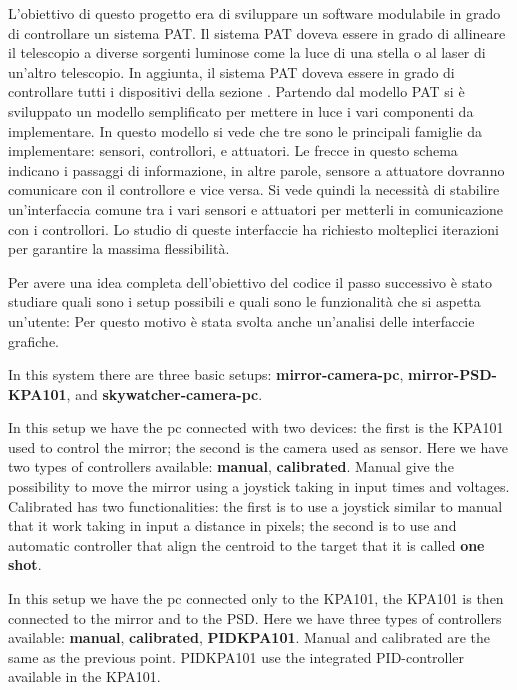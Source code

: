 L'obiettivo di questo progetto era di sviluppare un software modulabile in grado di controllare un sistema PAT. Il sistema PAT doveva essere in grado di allineare il telescopio a diverse sorgenti luminose come la luce di una stella o al laser di un'altro telescopio. In aggiunta, il sistema PAT doveva essere in grado di controllare tutti i dispositivi della sezione .
Partendo dal modello PAT  si è sviluppato un modello semplificato  per mettere in luce i vari componenti da implementare. In questo modello si vede che tre sono le principali famiglie da implementare: sensori, controllori, e attuatori. Le frecce in questo schema indicano i passaggi di informazione, in altre parole, sensore a attuatore dovranno comunicare con il controllore e vice versa. Si vede quindi la necessità di stabilire un'interfaccia comune tra i vari sensori e attuatori per metterli in comunicazione con i controllori. Lo studio di queste interfaccie ha richiesto molteplici iterazioni per garantire la massima flessibilità.

Per avere una idea completa dell'obiettivo del codice il passo successivo è stato studiare quali sono i setup possibili e quali sono le funzionalità che si aspetta un'utente: Per questo motivo è stata svolta anche un'analisi delle interfaccie grafiche.

In this system there are three basic setups:
\textbf{mirror-camera-pc}, \textbf{mirror-PSD-KPA101}, and \textbf{skywatcher-camera-pc}.

In this setup we have the pc connected with two devices: the first is
the KPA101 used to control the mirror; the second is the camera used as
sensor. Here we have two types of controllers available: \textbf{manual},
\textbf{calibrated}. Manual give the possibility to move the mirror using a joystick taking
in input times and voltages. Calibrated has two functionalities: the first is to use a joystick
similar to manual that it work taking in input a distance in pixels; the
second is to use and automatic controller that align the centroid to the
target that it is called \textbf{one shot}.

In this setup we have the pc connected only to the KPA101, the KPA101 is
then connected to the mirror and to the PSD. Here we have three types of controllers available: \textbf{manual}, \textbf{calibrated}, \textbf{PIDKPA101}. Manual and calibrated are the same as the previous point. PIDKPA101 use the integrated PID-controller available in the KPA101.





% 
